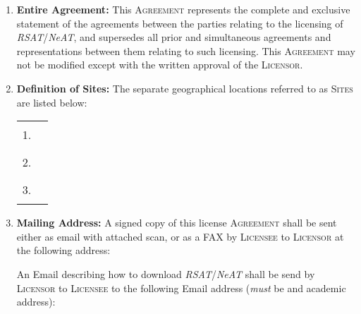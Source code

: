 \documentclass[12pt]{article}
\makeatletter
\newcommand{\RSAT}[0]{\emph{RSAT}\xspace}
\newcommand{\NeAT}[0]{\emph{NeAT}\xspace}
\newcommand{\Licensor}[0]{\textsc{Licensor}\xspace}
\newcommand{\Licensee}[0]{\textsc{Licensee}\xspace}
\newcommand{\Agreement}[0]{\textsc{Agreement}\xspace}
\newcommand{\Sites}[0]{\textsc{Sites}\xspace}
\newcommand{\Fillline}[0]{\rule{10cm}{1pt}}
\newcommand{\Paragraph}[2]{\item \textbf{#1:} #2}
\newcommand{\JvHemail}[0]{\texttt{\small Jacques.van-Helden@univmed.fr}\xspace}
\makeatother
\begin{document}
\begin{enumerate}
  \Paragraph{Entire Agreement}{This \Agreement represents the complete
    and exclusive statement of the agreements between the parties
    relating to the licensing of \RSAT/\NeAT, and supersedes all prior
    and simultaneous agreements and representations between them
    relating to such licensing. This \Agreement may not be modified
    except with the written approval of the \Licensor.  }

  \Paragraph{Definition of Sites}{
    The separate geographical locations 
    referred to as \Sites are listed below:

    \begin{center}
      \begin{tabular}{ll}
        1.&\Fillline\\[5mm]
        2.&\Fillline\\[5mm]
        3.&\Fillline
      \end{tabular}
    \end{center}
  }
  \label{DefSites}


  \Paragraph{Mailing Address}{A signed copy of this license \Agreement
    shall be sent either as email with attached scan, or as a FAX by \Licensee to
    \Licensor at the following address: \JvH


    An Email describing how to download \RSAT/\NeAT shall be send by \Licensor to 
    \Licensee to the following Email address (\emph{must} be and academic address):


}
\end{enumerate}
\end{document}
